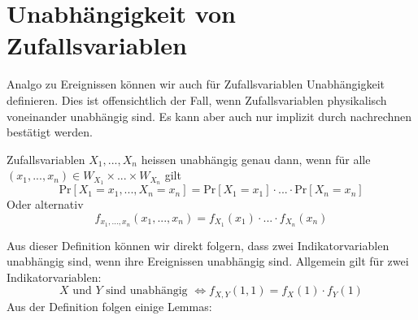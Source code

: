 \section{Unabhängigkeit von Zufallsvariablen}

Analgo zu Ereignissen können wir auch für Zufallsvariablen Unabhängigkeit definieren. Dies ist offensichtlich
der Fall, wenn Zufallsvariablen physikalisch voneinander unabhängig sind. Es kann aber auch nur implizit
durch nachrechnen bestätigt werden.

\begin{definition}
    Zufallsvariablen $X_1, ... , X_n$ heissen unabhängig genau dann, wenn für alle $(x_1, ... , x_n) \in W_{X_1} \times ... \times W_{X_n}$ 
    gilt
    $$\text{Pr}[X_1 = x_1, ... , X_n = x_n] = \text{Pr}[X_1 = x_1] \cdot ... \cdot \text{Pr}[X_n = x_n]$$
    Oder alternativ
    $$f_{x_1, ... , x_n}(x_1, ... , x_n) = f_{X_1}(x_1) \cdot ... \cdot f_{X_n}(x_n)$$
\end{definition}
\bigskip

Aus dieser Definition können wir direkt folgern, dass zwei Indikatorvariablen unabhängig sind, wenn ihre
Ereignissen unabhängig sind. Allgemein gilt für zwei Indikatorvariablen:
$$X \text{ und } Y \text{ sind unabhängig } \Leftrightarrow f_{X,Y}(1,1) = f_X(1) \cdot f_Y(1)$$
Aus der Definition folgen einige Lemmas:
